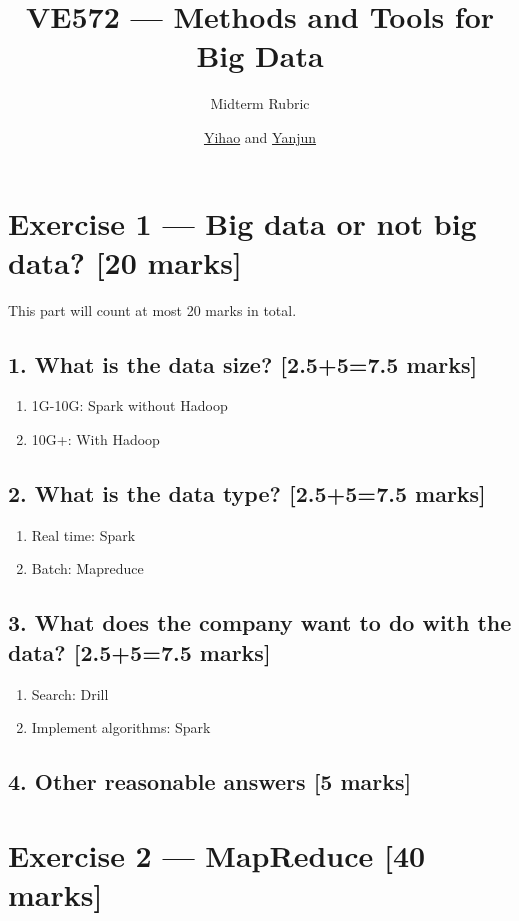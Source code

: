 \documentclass[11pt,a4paper]{article}
\title{VE572 --- Methods and Tools for Big Data}
\subtitle{Midterm Rubric}
\author{\href{mailto:liuyh615@sjtu.edu.cn}{Yihao} and \href{mailto:AuroraZYJ@sjtu.edu.cn}{Yanjun}}
\begin{document}
\maketitle

\section*{Exercise 1 --- Big data or not big data? [20 marks]}

This part will count at most 20 marks in total.

\subsection*{1. What is the data size? [2.5+5=7.5 marks]}

\begin{enumerate}
	\item 1G-10G: Spark without Hadoop
	\item 10G+: With Hadoop
\end{enumerate}

\subsection*{2. What is the data type? [2.5+5=7.5 marks]}

\begin{enumerate}
	\item Real time: Spark
	\item Batch: Mapreduce
\end{enumerate}

\subsection*{3. What does the company want to do with the data? [2.5+5=7.5 marks]}

\begin{enumerate}
	\item Search: Drill
	\item Implement algorithms: Spark
\end{enumerate}

\subsection*{4. Other reasonable answers [5 marks]}

\section*{Exercise 2 --- MapReduce [40 marks]}
\end{document}

